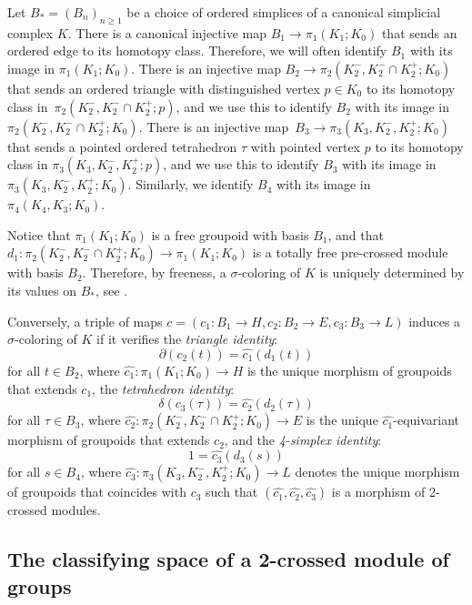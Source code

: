 \documentclass[a4paper, oneside]{amsart}
\numberwithin{equation}{subsection}
\theoremstyle{referencedlemma}
\theoremstyle{plain} %
\theoremstyle{remark}
\begin{document}
Let $B_* = (B_n)_{n\geqslant 1}$ be a choice of ordered simplices of a canonical simplicial complex $K$. There is a canonical injective map $B_1\to \pi_1(K_1; K_0)$ that sends an ordered edge to its homotopy class.  Therefore, we will often identify $B_1$ with its image in $\pi_1(K_1; K_0)$.  There is an injective map $B_2\to  \pi_2(K_2^-, K_2^-\cap K_2^+; K_0)$ that sends an ordered triangle with distinguished vertex $p\in K_0$ to its homotopy class in~\mbox{$\pi_2(K_2^-, K_2^-\cap K_2^+; p)$}, and we use this to identify $B_2$ with its image in $ \pi_2(K_2^-, K_2^-\cap K_2^+; K_0)$.  There is an injective map~\mbox{$B_3\to \pi_3(K_3, K_2^-, K_2^+; K_0)$} that sends a pointed ordered tetrahedron $\tau$ with pointed vertex $p$ to its homotopy class in $\pi_3(K_3, K_2^-, K_2^+;p)$, and we use this to identify $B_3$ with its image in $\pi_3(K_3, K_2^-, K_2^+;K_0)$.  Similarly, we identify $B_4$ with its image in~$\pi_4(K_4, K_3; K_0)$.   

Notice that $\pi_1(K_1;K_0)$ is a free groupoid with basis $B_1$, and that~\mbox{$d_1\colon \pi_2(K_2^-, K_2^-\cap K_2^+; K_0)\to \pi_1(K_1; K_0)$} is a totally free pre-crossed module with basis $B_2$.  Therefore, by freeness, a $\sigma$-coloring of $K$ is uniquely determined by its values on $B_*$, see \cite{brown_van_1987}.

Conversely, a triple of maps $c = (c_1 \colon B_1 \to H, c_2\colon B_2 \to E, c_3\colon B_3\to L)$ induces a $\sigma$-coloring of $K$ if it verifies the \emph{triangle identity}:
$$
\partial (c_2(t)) = \widehat{c_1}(d_1(t))
$$
for all $t\in B_2$, where $\widehat{c_1}\colon \pi_1(K_1; K_0)\to H$ is the unique morphism of groupoids that extends $c_1$, the \emph{tetrahedron identity}:
$$
\delta (c_3(\tau)) = \widehat{c_2}(d_2(\tau))
$$
for all $\tau \in B_3$, where $\widehat{c_2}\colon  \pi_2(K_2^-, K_2^-\cap K_2^+; K_0)\to E$ is the unique $\widehat{c_1}$-equivariant morphism of groupoids that extends $c_2$, and the \emph{4-simplex identity}:
$$
1  =\widehat{c_3}(d_3(s))
$$
for all $s\in B_4$, where $\widehat{c_3}\colon \pi_3(K_3, K_2^-, K_2^+; K_0)\to L$ denotes the unique morphism of groupoids that coincides with $c_3$ such that $(\widehat{c_1}, \widehat{c_2}, \widehat{c_3})$ is a morphism of 2-crossed modules.

\subsection{The classifying space of a 2-crossed module of groups}\label{Section_Classifying space}
\end{document}
